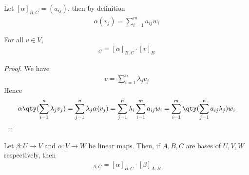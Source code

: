     \begin{note}
        Let $[\alpha]_{B,C} = (a_{ij})$, then by definition
        \begin{align*}
            \alpha (v_j) = \sum_{i=1}^m a_{ij} w_i
        \end{align*}
    \end{note} 

    \begin{lemma}
        For all $v \in V$,
        \begin{align*}
            [\alpha(v)]_C = [\alpha]_{B,C} \cdot [v]_{B}
        \end{align*}
    \end{lemma}

    \begin{proof}
        We have
        \begin{align*}
            v = \sum_{i=1}^n \lambda_j v_j
        \end{align*}
        Hence
        \begin{align*}
            \alpha\qty(\sum_{i=1}^n \lambda_j v_j) = \sum_{j=1}^n \lambda_j \alpha(v_j) = \sum_{j=1}^n \lambda_i \sum_{i=1}^m a_{ij} w_i = \sum_{i=1}^m \qty( \sum_{j=1}^n a_{ij} \lambda_j ) w_i
        \end{align*}
    \end{proof}

    \begin{lemma}
        Let $\beta \colon U \to V$ and $\alpha \colon V \to W$ be linear maps.
        Then, if $A,B,C$ are bases of $U,V,W$ respectively, then
        \begin{align*}
            [\alpha \circ \beta]_{A,C} = [\alpha]_{B,C} \cdot [\beta]_{A,B}
        \end{align*}
    \end{lemma}

